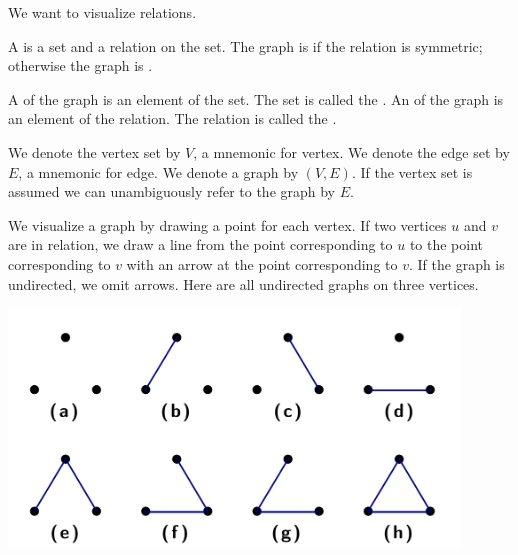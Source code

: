 
\sbasic



\sstart



We want to visualize relations.


A  is a set and a relation
on the set.
The graph is 
if the relation is symmetric; otherwise the
graph is .

A  of the graph is an element
of the set.
The set is called the .
An  of the graph is an element of
the relation.
The relation is called the .



We denote the vertex set by $V$, a mnemonic for
vertex.
We denote the edge set by $E$, a mnemonic for
edge.
We denote a graph by $(V, E)$.
If the vertex set is assumed we can
unambiguously refer to the graph by $E$.


We visualize a graph by drawing a
point for each vertex.
If two vertices $u$ and $v$ are in relation,
we draw a line from the point corresponding
to $u$ to the point corresponding to $v$ with
an arrow at the point corresponding to $v$.
If the graph is undirected, we omit arrows.
Here are all undirected graphs on three
vertices.

\includegraphics[width=0.9\textwidth]{../graphs/figs/graphs}

